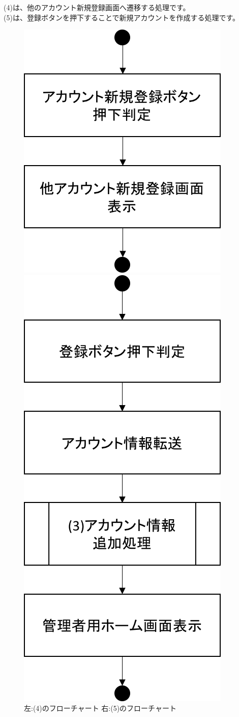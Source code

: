 (4)は、他のアカウント新規登録画面へ遷移する処理です。\\
(5)は、登録ボタンを押下することで新規アカウントを作成する処理です。


\begin{figure}[htbp]
 \begin{minipage}{0.5\hsize}
  \begin{center}
   \includegraphics[width=0.6\linewidth,clip]{./img/flow/4.png}
  \end{center}
 \end{minipage}
 \begin{minipage}{0.5\hsize}
  \begin{center}
   \includegraphics[width=0.5\linewidth,clip]{./img/flow/5.png}
  \end{center}
 \end{minipage}
 \caption{左:(4)のフローチャート 右:(5)のフローチャート}\label{fig:4to5}
\end{figure}


